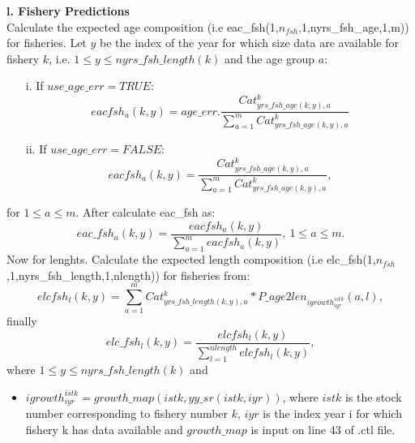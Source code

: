 \documentclass{article}
\begin{document}
\textbf{l. Fishery Predictions}\\
Calculate the expected age composition (i.e eac\_fsh(1,$n_{fsh}$,1,nyrs\_fsh\_age,1,m)) for fisheries. Let $y$ be the index of the year for which size data are available for fishery $k$, i.e.   $1\leq y \leq nyrs\_fsh\_length(k)$ and the age group $a$:
\begin{itemize}
\item [i.] If $use\_age\_err=TRUE$:
    \begin{equation}
    {eac{fsh}}_a(k,y)=age\_err.\dfrac{Cat_{yrs\_fsh\_age(k,y),a}^k}{\displaystyle\sum_{a=1}^mCat_{yrs\_fsh\_age(k,y),a}^k}
\end{equation}
\item [ii.] If $use\_age\_err=FALSE$:
\begin{equation}
    eacfsh_a(k,y)=\dfrac{Cat_{yrs\_fsh\_age(k,y),a}^k}{\displaystyle\sum_{a=1}^mCat_{yrs\_fsh\_age(k,y),a}^k},
\end{equation}
\end{itemize}
for $1\leq a \leq m$.
After calculate eac\_fsh as:
\begin{equation}
    eac\_fsh_a(k,y)=\dfrac{eacfsh_a(k,y)}{\displaystyle\sum_{a=1}^m eacfsh_a(k,y)}, \ 1\leq a \leq m.
\end{equation}
Now for lenghts. Calculate the expected length composition (i.e elc\_fsh(1,$n_{fsh}$,1,nyrs\_fsh\_length,1,nlength)) for fisheries from: 
\begin{equation}
elcfsh_l(k,y)=\sum_{a=1}^m Cat_{yrs\_fsh\_length(k,y),a}^k*P\_age2len_{igrowth^{istk}_{iyr}}(a,l),
\end{equation}
finally
\begin{equation}
elc\_fsh_l(k,y)=\dfrac{elcfsh_l(k,y)}{\displaystyle\sum_{l=1}^{nlength} elcfsh_l(k,y)},
\end{equation}
where $1\leq y \leq nyrs\_fsh\_length(k)$ and \\
\begin{itemize}
    \item $igrowth^{istk}_{iyr}=growth\_map(istk,yy\_sr(istk,iyr))$, where $istk$ is the stock number corresponding to fishery number $k$, $iyr$ is the index year i for which fishery k has data available and $growth\_map$ is input on line 43 of .ctl file.
\end{itemize}
\end{document}
